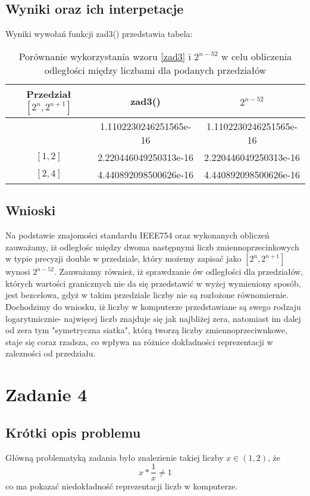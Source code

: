 \documentclass[a4paper,14pt]{report}
\begin{document}
\section{Wyniki oraz ich interpetacje}
Wyniki wywołań funkcji zad3() przedstawia tabela:
\begin{table}[h!]
\centering
\begin{tabular}{|c | c | c |} 
 \hline
 Przedział $[2^{n},2^{n+1}]$ & zad3() & $2^{n-52}$ \\ [0.5ex] 
 \hline\hline
 [$\frac{1}{2}$,1] & 1.1102230246251565e-16 & 1.1102230246251565e-16 \\ 
 $[1,2]$ & 2.220446049250313e-16 & 2.220446049250313e-16 \\
 $[2,4]$ & 4.440892098500626e-16 & 4.440892098500626e-16 \\
 \hline
\end{tabular}
\caption{Porównanie wykorzystania wzoru  \ref{zad3} i $2^{n-52}$ w celu obliczenia odległości między liczbami dla podanych przedziałów}
\label{TableKahan}
\end{table}
\section{Wnioski}
Na podstawie znajomości standardu IEEE754 oraz wykonanych obliczeń zauważamy, iż odległośc między dwoma następnymi liczb zmiennoprzecinkowych w typie precyzji double w przedziale, który możemy zapisać jako $[2^{n},2^{n+1}]$ wynosi $2^{n-52}$. Zauważamy również, iż sprawdzanie ów odległości dla przedziałów, których wartości granicznych nie da się przedstawić w wyżej wymieniony sposób, jest bezcelowa, gdyż w takim przedziale liczby nie są rozłożone równomiernie. Dochodzimy do wniosku, iż liczby w komputerze przedstawiane są swego rodzaju logarytmicznie- najwięcej liczb znajduje się jak najbliżej zera, natomiast im dalej od zera tym "symetryczna siatka", którą tworzą liczby zmiennoprzeciwnkowe, staje się coraz rzadsza, co wpływa na różnice dokładności reprezentacji w zalezności od przedziału.






\chapter{Zadanie 4}
\section{Krótki opis problemu}
Główną problematyką zadania było znalezienie takiej liczby $\textit{x} \in (1,2)$, że
\begin{equation}
  x*\frac{1}{x} \neq 1
  \label {warunekZad4}
\end{equation}
co ma pokazać niedokładność reprezentacji liczb w komputerze.
\end{document}
